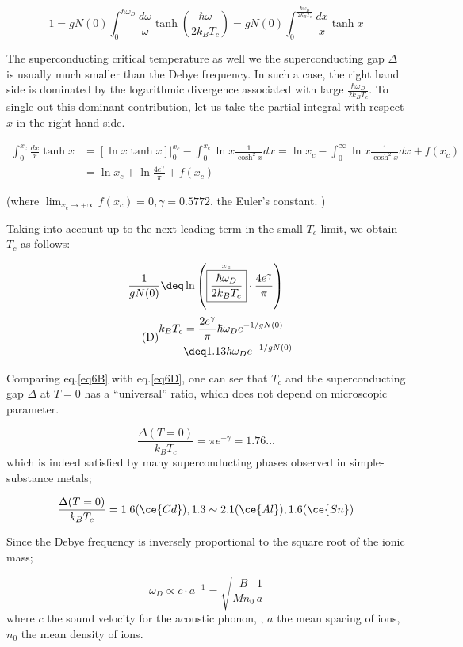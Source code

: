 \[1 = gN(0)\int_0^{\hbar\omega_D}\frac{d\omega}{\omega}\tanh\left(\frac{\hbar\omega}{2k_BT_c}\right) = gN(0)\int_0^{\frac{\hbar\omega_D}{2k_BT_c}}\frac{dx}{x}\tanh x \]

The superconducting critical temperature as well we the superconducting gap $\Delta$ is usually much smaller than the Debye frequency. In such a case, the right hand side is dominated by the logarithmic divergence associated with large $\displaystyle \frac{\hbar\omega_D}{2k_BT_c}$. To single out this dominant contribution, let us take the partial integral with respect $x$ in the right hand side. 

\[\begin{split}
\int_0^{x_c}\frac{dx}{x}\tanh x &= [\ln x\tanh x]\Big|_0^{x_c} - \int_0^{x_c}\ln x\frac{1}{\cosh^2 x}dx = \ln x_c - \int_0^{\infty}\ln x\frac{1}{\cosh^2 x}dx + f(x_c)\\
&=\ln x_c + \ln \frac{4e^\gamma}{\pi}+f(x_c)
\end{split}\]

(where $\displaystyle\lim_{x_c\to+\infty} f(x_c) = 0, \gamma = 0.5772$, the Euler's constant. )

Taking into account up to the next leading term in the small $T_c$ limit, we obtain $T_c$ as follows:

\[\frac{1}{gN(0)}\deq\ln\left(\overset{x_c}{\fbox{${\displaystyle\frac{\hbar\omega_D}{2k_BT_c}}$}}\cdot\frac{4e^\gamma}{\pi}\right) \]
\begin{align}\tag{D}\label{eq6D}
\begin{split}
k_BT_c &= \frac{2e^\gamma}{\pi}\hbar\omega_D e^{-1/gN(0)}\\
&\deq 1.13\hbar\omega_D e^{-1/gN(0)}
\end{split}
\end{align}

Comparing eq.\eqref{eq6B} with eq.\eqref{eq6D}, one can see that $T_c$ and the superconducting gap $\Delta$ at $T=0$ has a ``universal'' ratio, which does not depend on microscopic parameter. 

\[\frac{\Delta(T=0)}{k_BT_c} = \pi e^{-\gamma} = 1.76... \]
which is indeed satisfied by many superconducting phases observed in simple-substance metals; 

\[\frac{\Delta(T=0)}{k_BT_c} = 1.6(\ce{Cd}), 1.3\sim2.1(\ce{Al}), 1.6(\ce{Sn}) \]

Since the Debye frequency is inversely proportional to the square root of the ionic mass;

\[\omega_D\propto c\cdot a^{-1} = \sqrt{\frac{B}{Mn_0}}\frac{1}{a} \]
where $c$ the sound velocity for the acoustic phonon, , $a$ the mean spacing of ions, $n_0$ the mean density of ions. 

